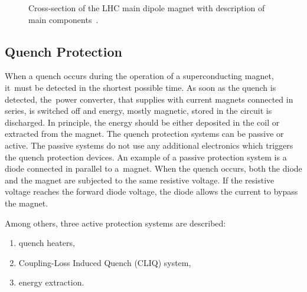 \begin{figure}[H]
    \centering
    \caption{Cross-section of the LHC main dipole magnet with description of main components~\cite{lhc_main_dipole_cross_section}.}
    \label{fig:cross_section_lhc_main_dipole}
\end{figure}

\subsection{Quench Protection}

When a quench occurs during the operation of a superconducting magnet, it~must be detected in the shortest possible time. As soon as the quench is detected, the~power converter, that supplies with current magnets connected in series, is switched off and energy, mostly magnetic, stored in the circuit is discharged. In principle, the energy should be either deposited in the coil or extracted from the magnet. The quench protection systems can be passive or active. The passive systems do not use any additional electronics which triggers the quench protection devices. An example of a passive protection system is a diode connected in parallel to a~magnet. When the quench occurs, both the diode and the magnet are subjected to the same resistive voltage. If the resistive voltage reaches the forward diode voltage, the diode allows the current to bypass the magnet.

Among others, three active protection systems are described: 

\begin{enumerate}
    \item quench heaters,
	\item Coupling-Loss Induced Quench (CLIQ) system,
	\item energy extraction.
\end{enumerate}

